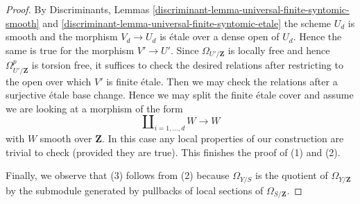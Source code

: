 \begin{proof}
\medskip\noindent
By Discriminants, Lemmas
\ref{discriminant-lemma-universal-finite-syntomic-smooth} and
\ref{discriminant-lemma-universal-finite-syntomic-etale}
the scheme $U_d$ is smooth and the morphism $V_d \to U_d$
is \'etale over a dense open of $U_d$.
Hence the same is true for the morphism
$V' \to U'$. Since $\Omega_{U'/\mathbf{Z}}$ is locally free and hence
$\Omega^p_{U'/\mathbf{Z}}$ is torsion
free, it suffices to check the desired relations
after restricting to the open over which $V'$ is finite \'etale.
Then we may check the relations after a surjective \'etale
base change. Hence we may split the finite \'etale cover
and assume we are looking at a morphism of the form
$$
\coprod\nolimits_{i = 1, \ldots, d} W \longrightarrow W
$$
with $W$ smooth over $\mathbf{Z}$.
In this case any local properties of our construction are trivial to check
(provided they are true). This finishes the proof of (1) and (2).

\medskip\noindent
Finally, we observe that (3) follows from (2) because $\Omega_{Y/S}$
is the quotient of $\Omega_{Y/\mathbf{Z}}$ by the submodule
generated by pullbacks of local sections of $\Omega_{S/\mathbf{Z}}$.
\end{proof}

